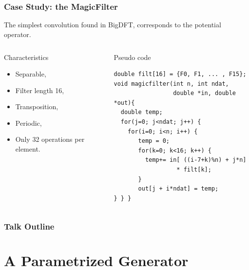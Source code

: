 \documentclass{beamer}
\begin{document}
\begin{frame}[fragile]
\frametitle{Case Study: the MagicFilter}
The simplest convolution found in BigDFT, corresponds to the potential operator.
\begin{columns}
\column{4cm}
\begin{block}{Characteristics}
\begin{itemize}
\item Separable,
\item Filter length 16,
\item Transposition,
\item Periodic,
\item Only 32 operations per element.
\end{itemize}
\end{block}
\column{6.2cm}
\begin{block}{Pseudo code}
\tiny
\lstset{style=C}
\begin{lstlisting}
double filt[16] = {F0, F1, ... , F15};
void magicfilter(int n, int ndat, 
                 double *in, double *out){
  double temp;
  for(j=0; j<ndat; j++) {
    for(i=0; i<n; i++) {
       temp = 0;
       for(k=0; k<16; k++) {
         temp+= in[ ((i-7+k)%n) + j*n] 
                  * filt[k];
       }
       out[j + i*ndat] = temp;
} } }
\end{lstlisting}
\end{block}
\end{columns}
\end{frame}

\begin{frame}
    \frametitle{Talk Outline}
    \tableofcontents[hideallsubsections,sections={2-}]
\end{frame}

\section{A Parametrized Generator}
\end{document}
